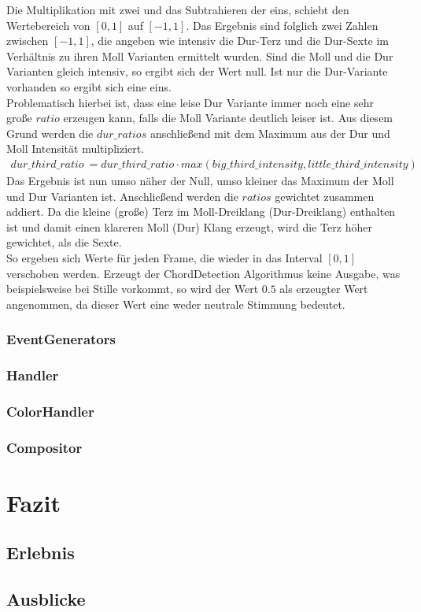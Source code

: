 \documentclass[11pt,a4paper]{article}
\begin{document}
\noindent
Die Multiplikation mit zwei und das Subtrahieren der eins, schiebt den Wertebereich von $[0, 1]$ auf $[-1, 1]$. Das Ergebnis sind folglich zwei Zahlen zwischen $[-1, 1]$, die angeben wie intensiv die Dur-Terz und die Dur-Sexte im Verhältnis zu ihren Moll Varianten ermittelt wurden. Sind die Moll und die Dur Varianten gleich intensiv, so ergibt sich der Wert null. Ist nur die Dur-Variante vorhanden so ergibt sich eine eins.\\
Problematisch hierbei ist, dass eine leise Dur Variante immer noch eine sehr große $ratio$ erzeugen kann, falls die Moll Variante deutlich leiser ist. Aus diesem Grund werden die $dur\_ratios$ anschließend mit dem Maximum aus der Dur und Moll Intensität multipliziert.
\begin{align}
dur\_third\_ratio\ = dur\_third\_ratio \cdot max(big\_third\_intensity, little\_third\_intensity)
\end{align}
\noindent
Das Ergebnis ist nun umso näher der Null, umso kleiner das Maximum der Moll und Dur Varianten ist. Anschließend werden die $ratios$ gewichtet zusammen addiert. Da die kleine (große) Terz im Moll-Dreiklang (Dur-Dreiklang) enthalten ist und damit einen klareren Moll (Dur) Klang erzeugt, wird die Terz höher gewichtet, als die Sexte.\\
So ergeben sich Werte für jeden Frame, die wieder in das Interval $[0, 1]$ verschoben werden. Erzeugt der ChordDetection Algorithmus keine Ausgabe, was beispielsweise bei Stille vorkommt, so wird der Wert $0.5$ als erzeugter Wert angenommen, da dieser Wert eine weder neutrale Stimmung bedeutet.
\newpage



\subsubsection{EventGenerators}

\subsubsection{Handler}
\subsubsection*{ColorHandler}

\subsubsection{Compositor}

\section{Fazit}

\subsection{Erlebnis}
\subsection{Ausblicke}

\newpage




\listoftables
\listoffigures
\end{document}
